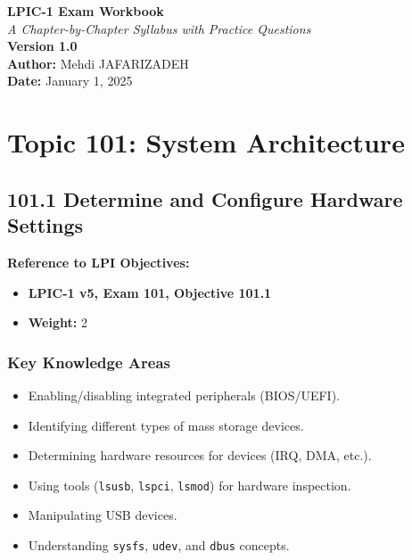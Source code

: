 \documentclass[a4paper]{report}
\begin{document}
\begin{titlepage}
    \centering
    \vspace*{3cm}
    {\Huge \textbf{LPIC-1 Exam Workbook}}\\
    \vspace{1cm}
    {\large \textit{A Chapter-by-Chapter Syllabus with Practice Questions}}\\
    \vfill
    {\large \textbf{Version 1.0}}\\
    \vspace{2cm}
    \vfill
    \textbf{Author:} Mehdi JAFARIZADEH \\
    \textbf{Date:} January 1, 2025
    \vspace{2cm}
\end{titlepage}

\tableofcontents
\newpage

\chapter{Topic 101: System Architecture}




\section*{101.1 Determine and Configure Hardware Settings}

\textbf{Reference to LPI Objectives:}  
\begin{itemize}
    \item \textbf{LPIC-1 v5, Exam 101, Objective 101.1}
    \item \textbf{Weight:} 2
\end{itemize}

\subsection*{Key Knowledge Areas}
\begin{itemize}
    \item Enabling/disabling integrated peripherals (BIOS/UEFI).
    \item Identifying different types of mass storage devices.
    \item Determining hardware resources for devices (IRQ, DMA, etc.).
    \item Using tools (\texttt{lsusb}, \texttt{lspci}, \texttt{lsmod}) for hardware inspection.
    \item Manipulating USB devices.
    \item Understanding \texttt{sysfs}, \texttt{udev}, and \texttt{dbus} concepts.
\end{itemize}
\end{document}
